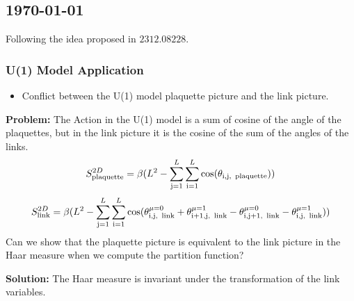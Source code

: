 \begin{center}
\section*{\creationmonth}
\end{center}

\subsection*{\monthdayyeardate\today}
Following the idea proposed in $2312.08228$. 
\subsubsection*{U(1) Model Application}
\begin{itemize}
    \item Conflict between the U(1) model plaquette picture and the link picture.
\end{itemize}

\textbf{Problem:} 
The Action in the U(1) model is a sum of cosine of the angle of the plaquettes, but in the link picture  it is the cosine of the sum of the angles of the links.
\begin{equation}
    S_{\text{plaquette}}^{2D} = \beta(L^2- \sum_{\text{j}=1}^{L}\sum_{\text{i}=1}^{L} \cos(\theta_{\text{i,j, \,plaquette}}))
\end{equation}
\begin{equation}
    S_{\text{link}}^{2D} = \beta(L^2- \sum_{\text{j}=1}^{L}\sum_{\text{i}=1}^{L}\cos(\theta_{\text{i,j, \,link}}^{\mu=0}+\theta_{\text{i+1,j, \,link}}^{\mu=1}-\theta_{\text{i,j+1, \,link}}^{\mu=0}-\theta_{\text{i,j, \,link}}^{\mu=1}))
\end{equation}
Can we show that the plaquette picture is equivalent to the link picture in the Haar measure when we compute the partition function?

\textbf{Solution:}
The Haar measure is invariant under the transformation of the link variables.